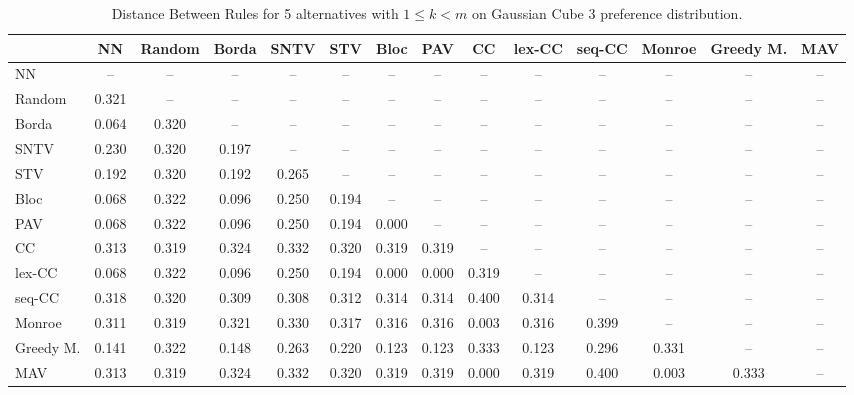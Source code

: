 
\begin{table*}
\centering
\begin{tabular}{lccccccccccccc}
\toprule
 & NN & Random & Borda & SNTV & STV & Bloc & PAV & CC & lex-CC & seq-CC & Monroe & Greedy M. & MAV \\
\midrule
NN & -- & -- & -- & -- & -- & -- & -- & -- & -- & -- & -- & -- & -- \\
Random & 0.321 & -- & -- & -- & -- & -- & -- & -- & -- & -- & -- & -- & -- \\
Borda & 0.064 & 0.320 & -- & -- & -- & -- & -- & -- & -- & -- & -- & -- & -- \\
SNTV & 0.230 & 0.320 & 0.197 & -- & -- & -- & -- & -- & -- & -- & -- & -- & -- \\
STV & 0.192 & 0.320 & 0.192 & 0.265 & -- & -- & -- & -- & -- & -- & -- & -- & -- \\
Bloc & 0.068 & 0.322 & 0.096 & 0.250 & 0.194 & -- & -- & -- & -- & -- & -- & -- & -- \\
PAV & 0.068 & 0.322 & 0.096 & 0.250 & 0.194 & 0.000 & -- & -- & -- & -- & -- & -- & -- \\
CC & 0.313 & 0.319 & 0.324 & 0.332 & 0.320 & 0.319 & 0.319 & -- & -- & -- & -- & -- & -- \\
lex-CC & 0.068 & 0.322 & 0.096 & 0.250 & 0.194 & 0.000 & 0.000 & 0.319 & -- & -- & -- & -- & -- \\
seq-CC & 0.318 & 0.320 & 0.309 & 0.308 & 0.312 & 0.314 & 0.314 & 0.400 & 0.314 & -- & -- & -- & -- \\
Monroe & 0.311 & 0.319 & 0.321 & 0.330 & 0.317 & 0.316 & 0.316 & 0.003 & 0.316 & 0.399 & -- & -- & -- \\
Greedy M. & 0.141 & 0.322 & 0.148 & 0.263 & 0.220 & 0.123 & 0.123 & 0.333 & 0.123 & 0.296 & 0.331 & -- & -- \\
MAV & 0.313 & 0.319 & 0.324 & 0.332 & 0.320 & 0.319 & 0.319 & 0.000 & 0.319 & 0.400 & 0.003 & 0.333 & -- \\
\bottomrule
\end{tabular}

\caption{Distance Between Rules for 5 alternatives with $1 \leq k < m$ on Gaussian Cube 3 preference distribution.}
\end{table*}

